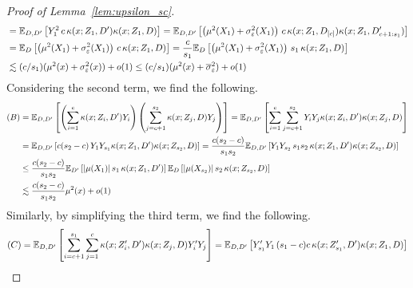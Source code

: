 \begin{proof}[Proof of Lemma~\ref{lem:upsilon_sc}]
\begin{equation}
\begin{aligned}
			 & = \mathbb{E}_{D, D^{\prime}}\left[Y_{1}^2 \, c \, \kappa(x; Z_1, D^{\prime})\kappa(x; Z_1, D)\right]
			= \mathbb{E}_{D, D^{\prime}}\left[\left(\mu^2(X_{1}) + \sigma^2_{\varepsilon}(X_{1})\right) \, c \, \kappa(x; Z_1, D_{[c]})\kappa(x; Z_1, D^{\prime}_{c+1:s_1})\right] \\
			 & = \mathbb{E}_{D}\left[\left(\mu^2(X_{1}) + \sigma^2_{\varepsilon}(X_{1})\right) \, c \, \kappa(x; Z_1, D)\right]
			= \frac{c}{s_1} \mathbb{E}_{D}\left[\left(\mu^2(X_{1}) + \sigma^2_{\varepsilon}(X_{1})\right) \, s_1 \, \kappa(x; Z_1, D)\right]                                               \\
			 & \lesssim (c/s_1)(\mu^2(x) + \sigma^2_{\varepsilon}(x)) + o(1)
			\leq (c/s_1)(\mu^2(x) + \overline{\sigma}^2_{\varepsilon}) + o(1)
		\end{aligned}
	\end{equation}
	Considering the second term, we find the following.
	\begin{equation}
		\begin{aligned}
			(B)
			 & = \mathbb{E}_{D, D^{\prime}}\left[\left(\sum_{i = 1}^{c}\kappa(x; Z_{i}, D^{\prime}) Y_{i}\right)\left(\sum_{j = c+1}^{s_2} \kappa(x; Z_{j}, D) Y_j\right)\right]
			= \mathbb{E}_{D, D^{\prime}}\left[\sum_{i = 1}^{c}\sum_{j = c+1}^{s_2}Y_{i} Y_j \kappa(x; Z_{i}, D^{\prime})\kappa(x; Z_{j}, D)\right]                               \\
			 & = \mathbb{E}_{D, D^{\prime}}\left[c(s_2 - c) \, Y_1 Y_{s_1} \kappa(x; Z_1, D^{\prime})\kappa(x; Z_{s_2}, D)\right]
			= \frac{c (s_2 - c)}{s_1 s_2}\mathbb{E}_{D, D^{\prime}}\left[Y_1 Y_{s_2} \, s_1 s_2 \,\kappa(x; Z_1, D^{\prime})\kappa(x; Z_{s_2}, D)\right]                   \\
			 & \leq \frac{c (s_2 - c)}{s_1 s_2}
			\mathbb{E}_{D^{\prime}}\left[|\mu(X_1)| \, s_1  \,\kappa(x; Z_1, D^{\prime})\right]
			\mathbb{E}_{D}\left[|\mu(X_{s_2})| \, s_2  \,\kappa(x; Z_{s_2}, D)\right]                                                                                       \\
			 & \lesssim \frac{c(s_2 - c)}{s_1 s_2} \mu^2(x) + o(1)
		\end{aligned}
	\end{equation}
	Similarly, by simplifying the third term, we find the following.
	\begin{equation}
		\begin{aligned}
			(C)
			 & = \E_{D, D^{\prime}}\left[\sum_{i = c+1}^{s_1}\sum_{j = 1}^{c} \kappa(x; Z_{i}^{\prime}, D^{\prime})\kappa(x; Z_{j}, D)Y_{i}^{\prime} Y_j\right]
			= \E_{D, D^{\prime}}\left[Y_{s_1}^{\prime} Y_{1} \, (s_1 - c)c \, \kappa(x; Z_{s_1}^{\prime}, D^{\prime})\kappa(x; Z_1, D)\right]                                                    \\

\end{aligned}
\end{equation}
\end{proof}

